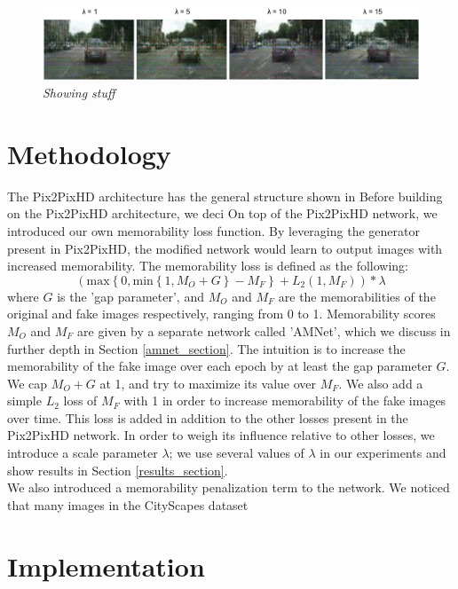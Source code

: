\documentclass[10pt,twocolumn,letterpaper]{article}
\begin{document}
\begin{figure}
    \centering
    \label{pic2}
    \includegraphics[width=\linewidth]{pic2.png}
    \caption{\textit{Showing stuff}}
\end{figure}



\section{Methodology}
The Pix2PixHD architecture has the general structure shown in 
Before building on the Pix2PixHD architecture, we deci
On top of the Pix2PixHD network, we introduced our own memorability loss function. By leveraging the generator present in Pix2PixHD, the modified network would learn to output images with increased memorability. The memorability loss is defined as the following:
$$ \left(\text{max} \left\{ 0, \text{min} \left\{ 1, M_O + G \right\} - M_F \right\} + L_2 \left(1, M_F \right) \right) * \lambda $$
where $G$ is the 'gap parameter', and $M_O$ and $M_F$ are the memorabilities of the original and fake images respectively, ranging from 0 to 1. Memorability scores $M_O$ and $M_F$ are given by a separate network called 'AMNet', which we discuss in further depth in Section \ref{amnet_section}. The intuition is to increase the memorability of the fake image over each epoch by at least the gap parameter $G$. We cap $M_O + G$ at 1, and try to maximize its value over $M_F$. We also add a simple $L_2$ loss of $M_F$ with 1 in order to increase memorability of the fake images over time. This loss is added in addition to the other losses present in the Pix2PixHD network. In order to weigh its influence relative to other losses, we introduce a scale parameter $\lambda$; we use several values of $\lambda$ in our experiments and show results in Section \ref{results_section}.\\
\indent We also introduced a memorability penalization term to the network. We noticed that many images in the CityScapes dataset

\section{Implementation}
\end{document}
